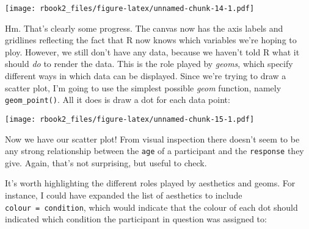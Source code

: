 \documentclass[]{book}
\newenvironment{Shaded}{\begin{snugshade}}{\end{snugshade}}
\newcommand{\DataTypeTok}[1]{\textcolor[rgb]{0.13,0.29,0.53}{#1}}
\newcommand{\KeywordTok}[1]{\textcolor[rgb]{0.13,0.29,0.53}{\textbf{#1}}}
\newcommand{\NormalTok}[1]{#1}
\newcommand{\OperatorTok}[1]{\textcolor[rgb]{0.81,0.36,0.00}{\textbf{#1}}}
\newcommand{\StringTok}[1]{\textcolor[rgb]{0.31,0.60,0.02}{#1}}
\begin{document}
\texttt{[image: rbook2\_files/figure-latex/unnamed-chunk-14-1.pdf]}

Hm. That's clearly some progress. The canvas now has the axis labels and gridlines reflecting the fact that R now knows which variables we're hoping to ploy. However, we still don't have any data, because we haven't told R what it should \emph{do} to render the data. This is the role played by \emph{geoms}, which specify different ways in which data can be displayed. Since we're trying to draw a scatter plot, I'm going to use the simplest possible \emph{geom} function, namely \texttt{geom\_point()}. All it does is draw a dot for each data point:

\begin{Shaded}
\end{Shaded}

\texttt{[image: rbook2\_files/figure-latex/unnamed-chunk-15-1.pdf]}

Now we have our scatter plot! From visual inspection there doesn't seem to be any strong relationship between the \texttt{age} of a participant and the \texttt{response} they give. Again, that's not surprising, but useful to check.

It's worth highlighting the different roles played by aesthetics and geoms. For instance, I could have expanded the list of aesthetics to include \texttt{colour\ =\ condition}, which would indicate that the colour of each dot should indicated which condition the participant in question was assigned to:

\begin{Shaded}
\end{Shaded}
\end{document}
